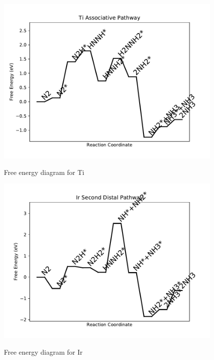\documentclass{article}
\begin{document}
\twocolumn
\newpage
\begin{figure}
\includegraphics[width=1\linewidth]{data/plots/Ti_associative.pdf}
\label{fig:Ti_associative}
\caption{Free energy diagram for Ti}
\end{figure}

\begin{figure}
\includegraphics[width=1\linewidth]{data/plots/Ir_distal_2.pdf}
\label{fig:Ir_distal_2}
\caption{Free energy diagram for Ir}
\end{figure}
\end{document}
